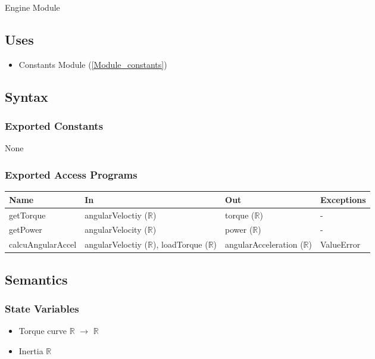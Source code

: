 \documentclass[12pt, titlepage]{article}
\begin{document}
Engine Module

\subsection{Uses}

\begin{itemize}
  \item Constants Module (\ref{Module_constants})
\end{itemize}

\subsection{Syntax}

\subsubsection{Exported Constants}
None

\subsubsection{Exported Access Programs}

\begin{center}
\begin{tabular}{p{4cm} p{4cm} p{4cm} p{2cm}}
\hline
\textbf{Name} & \textbf{In} & \textbf{Out} & \textbf{Exceptions} \\
\hline
getTorque & angularVeloctiy ($\mathbb{R}$) & torque ($\mathbb{R}$) & - \\
getPower & angularVelocity ($\mathbb{R}$) & power ($\mathbb{R}$) & - \\
calcuAngularAccel & angularVeloctiy ($\mathbb{R}$), loadTorque ($\mathbb{R}$)  & angularAcceleration ($\mathbb{R}$) & ValueError \\
\hline
\end{tabular}
\end{center}

\subsection{Semantics}

\subsubsection{State Variables}

\begin{itemize}
  \item Torque curve $\mathbb{R}$ $\rightarrow$ $\mathbb{R}$
  \item Inertia $\mathbb{R}$
\end{itemize}
\end{document}
